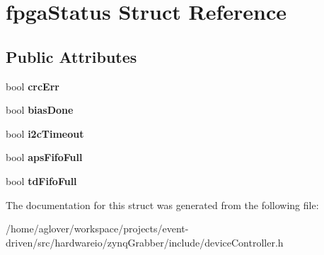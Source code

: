 \hypertarget{structfpgaStatus}{}\section{fpga\+Status Struct Reference}
\label{structfpgaStatus}
\subsection*{Public Attributes}
\begin{DoxyCompactItemize}
\item 
bool {\bfseries crc\+Err}\hypertarget{structfpgaStatus_a9cafcfd4e38fa240b31b47611bac3083}{}\label{structfpgaStatus_a9cafcfd4e38fa240b31b47611bac3083}

\item 
bool {\bfseries bias\+Done}\hypertarget{structfpgaStatus_aef80b6cd223b1195b317a70e7f57b58c}{}\label{structfpgaStatus_aef80b6cd223b1195b317a70e7f57b58c}

\item 
bool {\bfseries i2c\+Timeout}\hypertarget{structfpgaStatus_ab37e07a6f39e462634df9d560c0abe45}{}\label{structfpgaStatus_ab37e07a6f39e462634df9d560c0abe45}

\item 
bool {\bfseries aps\+Fifo\+Full}\hypertarget{structfpgaStatus_a01141df5867a1c152efd241a5341cfb7}{}\label{structfpgaStatus_a01141df5867a1c152efd241a5341cfb7}

\item 
bool {\bfseries td\+Fifo\+Full}\hypertarget{structfpgaStatus_a432c220a53f8a0639cb2b0ef1284ef14}{}\label{structfpgaStatus_a432c220a53f8a0639cb2b0ef1284ef14}

\end{DoxyCompactItemize}


The documentation for this struct was generated from the following file\+:\begin{DoxyCompactItemize}
\item 
/home/aglover/workspace/projects/event-\/driven/src/hardwareio/zynq\+Grabber/include/device\+Controller.\+h\end{DoxyCompactItemize}
